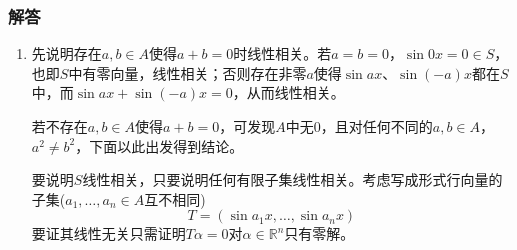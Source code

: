 \documentclass[a4paper,UTF8,fontset=windows,AutoFakeBold]{ctexart}
\begin{document}
\subsubsection{解答}
\begin{enumerate}
    \item 先说明存在$a,b\in A$使得$a+b=0$时线性相关。若$a=b=0$，$\sin 0x=0\in S$，也即$S$中有零向量，线性相关；否则存在非零$a$使得$\sin ax$、$\sin(-a)x$都在$S$中，而$\sin ax+\sin(-a)x=0$，从而线性相关。
    
    若不存在$a,b\in A$使得$a+b=0$，可发现$A$中无0，且对任何不同的$a,b\in A$，$a^2\ne b^2$，下面以此出发得到结论。

    要说明$S$线性相关，只要说明任何有限子集线性相关。考虑写成形式行向量的子集($a_1,\dots,a_n\in A$互不相同)
    $$T=(\sin a_1x,\dots,\sin a_nx)$$
    要证其线性无关只需证明$T\alpha=0$对$\alpha\in\mathbb{R}^n$只有零解。


\end{enumerate}
\end{document}
